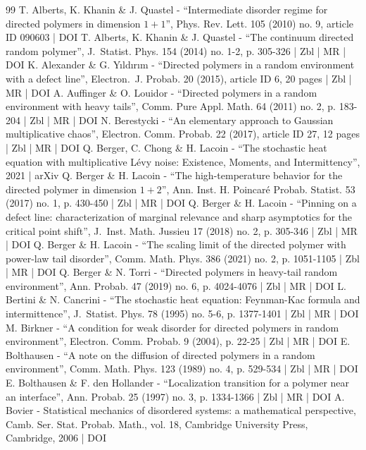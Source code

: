 \documentclass[10pt]{amsart}
\theoremstyle{definition}
\begin{document}
\begin{thebibliography}{99}
T. Alberts, K. Khanin \& J. Quastel - “Intermediate disorder regime for directed polymers in dimension $1+1$”, Phys. Rev. Lett. 105 (2010) no. 9, article ID 090603 | DOI
T. Alberts, K. Khanin \& J. Quastel - “The continuum directed random polymer”, J. Statist. Phys. 154 (2014) no. 1-2, p. 305-326 | Zbl | MR | DOI
K. Alexander \& G. Yıldırım - “Directed polymers in a random environment with a defect line”, Electron. J. Probab. 20 (2015), article ID 6, 20 pages | Zbl | MR | DOI
A. Auffinger \& O. Louidor - “Directed polymers in a random environment with heavy tails”, Comm. Pure Appl. Math. 64 (2011) no. 2, p. 183-204 | Zbl | MR | DOI
N. Berestycki - “An elementary approach to Gaussian multiplicative chaos”, Electron. Comm. Probab. 22 (2017), article ID 27, 12 pages | Zbl | MR | DOI
Q. Berger, C. Chong \& H. Lacoin - “The stochastic heat equation with multiplicative Lévy noise: Existence, Moments, and Intermittency”, 2021 | arXiv
Q. Berger \& H. Lacoin - “The high-temperature behavior for the directed polymer in dimension $1+2$”, Ann. Inst. H. Poincaré Probab. Statist. 53 (2017) no. 1, p. 430-450 | Zbl | MR | DOI
Q. Berger \& H. Lacoin - “Pinning on a defect line: characterization of marginal relevance and sharp asymptotics for the critical point shift”, J. Inst. Math. Jussieu 17 (2018) no. 2, p. 305-346 | Zbl | MR | DOI
Q. Berger \& H. Lacoin - “The scaling limit of the directed polymer with power-law tail disorder”, Comm. Math. Phys. 386 (2021) no. 2, p. 1051-1105 | Zbl | MR | DOI
Q. Berger \& N. Torri - “Directed polymers in heavy-tail random environment”, Ann. Probab. 47 (2019) no. 6, p. 4024-4076 | Zbl | MR | DOI
L. Bertini \& N. Cancrini - “The stochastic heat equation: Feynman-Kac formula and intermittence”, J. Statist. Phys. 78 (1995) no. 5-6, p. 1377-1401 | Zbl | MR | DOI
M. Birkner - “A condition for weak disorder for directed polymers in random environment”, Electron. Comm. Probab. 9 (2004), p. 22-25 | Zbl | MR | DOI
E. Bolthausen - “A note on the diffusion of directed polymers in a random environment”, Comm. Math. Phys. 123 (1989) no. 4, p. 529-534 | Zbl | MR | DOI
E. Bolthausen \& F. den Hollander - “Localization transition for a polymer near an interface”, Ann. Probab. 25 (1997) no. 3, p. 1334-1366 | Zbl | MR | DOI
A. Bovier - Statistical mechanics of disordered systems: a mathematical perspective, Camb. Ser. Stat. Probab. Math., vol. 18, Cambridge University Press, Cambridge, 2006 | DOI

\end{thebibliography}
\end{document}
